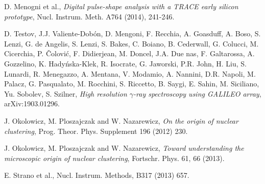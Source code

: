 \begin{thebibliography}{20}

  D. Menogni et al.,
  \emph{Digital pulse-shape analysis with a TRACE early silicon prototype}, Nucl. Instrum. Meth. A764 (2014), 241-246.

  D. Testov, J.J. Valiente-Dobón, D. Mengoni, F. Recchia, A. Goasduff, A. Boso, S. Lenzi, G. de Angelis, S. Lenzi, S. Bakes, C. Boiano, B. Cederwall, G. Colucci, M. Cicerchia, P. Čolović, F. Didierjean, M. Doncel, J.A. Due {n}as, F. Galtarossa, A. Gozzelino, K. Hadyńska-Klek, R. Isocrate, G. Jaworski, P.R. John, H. Liu, S. Lunardi, R. Menegazzo, A. Mentana, V. Modamio, A. Nannini, D.R. Napoli, M. Palacz, G. Pasqualato, M. Rocchini, S. Riccetto, B. Saygi, E. Sahin, M. Siciliano, Yu. Sobolev, S. Szilner,
  \emph{High resolution $\gamma$-ray spectroscopy using GALILEO array}, arXiv:1903.01296.
  
  J. Okolowicz, M. Ploszajczak and W. Nazarewicz,
  \emph{On the origin of nuclear clustering}, Prog. Theor. Phys. Supplement 196 (2012) 230.

  J. Okolowicz, M. Ploszajczak and W. Nazarewicz,
  \emph{Toward understanding the microscopic origin of nuclear clustering}, Fortschr. Phys. 61, 66 (2013).

  E. Strano et al., Nucl. Instrum. Methods, B317 (2013) 657.
  
\end{thebibliography}
